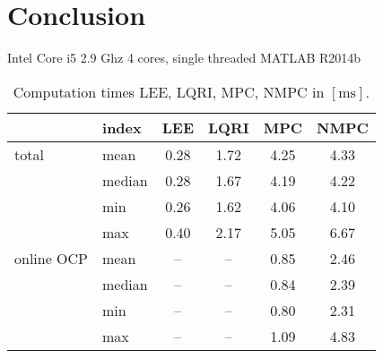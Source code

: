 \chapter{Conclusion}
\label{sec:conclusion}

Intel Core i5 2.9 Ghz 4 cores, single threaded MATLAB R2014b
\begin{table}
\begin{center}
\caption{Computation times LEE, LQRI, MPC, NMPC in $[\si{\milli\second}]$.}\vspace{1ex}
\label{tab:computation_times}
\begin{tabular}{ll|cccc}
\hline
      & index  & LEE        & LQRI       & MPC        & NMPC       \\ \hline \hline
total & mean   & \num{0.28} & \num{1.72} & \num{4.25} & \num{4.33} \\
      & median & \num{0.28} & \num{1.67} & \num{4.19} & \num{4.22} \\
      & min    & \num{0.26} & \num{1.62} & \num{4.06} & \num{4.10} \\
      & max    & \num{0.40} & \num{2.17} & \num{5.05} & \num{6.67} \\
\hline
online OCP & mean   & -- & -- & \num{0.85} & \num{2.46}\\
           & median & -- & -- & \num{0.84} & \num{2.39}\\
           & min    & -- & -- & \num{0.80} & \num{2.31}\\
           & max    & -- & -- & \num{1.09} & \num{4.83}\\
\hline
\end{tabular}
\end{center}
\end{table}